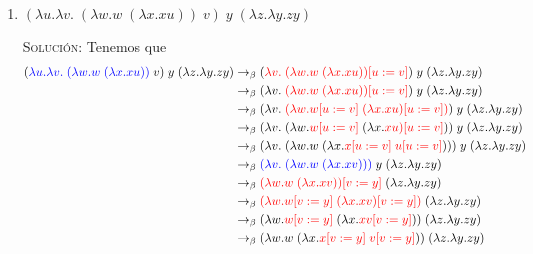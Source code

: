 \documentclass[letterpaper,11pt]{article}
\begin{document}
\begin{enumerate}
\begin{enumerate}
        \item $(\lambda u. \lambda v. \; (\lambda w.w \; (\lambda x.xu)) \; v) 
        \; y \; (\lambda z. \lambda y.zy)$

        \textsc{Solución:} Tenemos que 
        \begin{align*}
            (\textcolor{blue}{\lambda u. \lambda v. \; (\lambda w.w \; 
                                                       (\lambda x.xu))} \; v) 
            \; y \; (\lambda z. \lambda y.zy)
            &\rightarrow_{\beta}
            (\textcolor{red}{\lambda v. \; (\lambda w.w \; (\lambda x.xu))
                             [u := v]}) \; y \; (\lambda z. \lambda y.zy) \\
            &\rightarrow_{\beta}
            (\lambda v. \; \textcolor{red}{(\lambda w.w \; (\lambda x.xu))
            [u := v]}) \; y \; (\lambda z. \lambda y.zy) \\
            &\rightarrow_{\beta}
            (\lambda v. \; \textcolor{red}{(\lambda w.w [u := v] \; 
            (\lambda x.xu) [u := v])}) \; y \; (\lambda z. \lambda y.zy) \\
            &\rightarrow_{\beta}
            (\lambda v. \; (\lambda w. \textcolor{red}{w [u := v]} \;
            (\lambda x. \textcolor{red}{xu) [u := v]})) \; y \; 
            (\lambda z. \lambda y.zy) \\
            &\rightarrow_{\beta}
            (\lambda v. \; (\lambda w.w \; (\lambda x. 
            \textcolor{red}{x[u := v] \; u[u := v]}))) \; y \; 
            (\lambda z. \lambda y.zy) \\
            &\rightarrow_{\beta}
            \textcolor{blue}{(\lambda v. \; (\lambda w.w \; (\lambda x.xv)))}
            \; y \; (\lambda z. \lambda y.zy) \\
            &\rightarrow_{\beta}
            \textcolor{red}{(\lambda w.w \; (\lambda x.xv)) [v := y]}
            \; (\lambda z. \lambda y.zy) \\
            &\rightarrow_{\beta}
            \textcolor{red}{(\lambda w.w [v := y] \; (\lambda x.xv) [v := y])}
            \; (\lambda z. \lambda y.zy) \\
            &\rightarrow_{\beta}
            (\lambda w. \textcolor{red}{w [v := y]} \; (\lambda x.
            \textcolor{red}{xv [v := y]})) \; (\lambda z. \lambda y.zy) \\
            &\rightarrow_{\beta}
            (\lambda w.w \; (\lambda x. 
            \textcolor{red}{x [v := y] \; v [v := y]}))
            \; (\lambda z. \lambda y.zy) \\

\end{align*}
\end{enumerate}
\end{enumerate}
\end{document}
